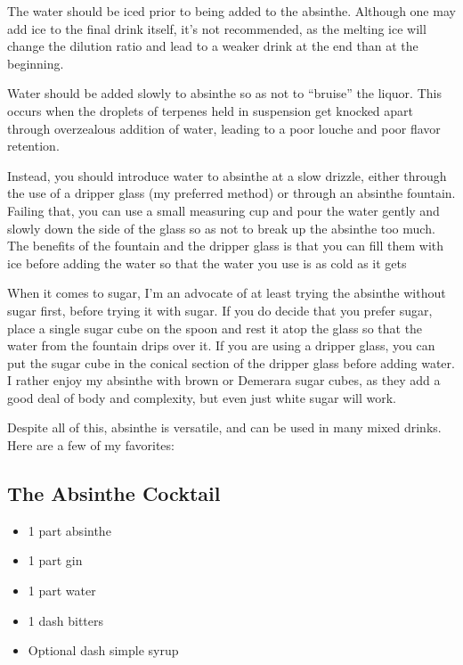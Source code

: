 \documentclass[12pt,letterpaper,oneside]{memoir}
\begin{document}
  The water should be iced prior to being added to the absinthe.  Although one may add ice to the final drink itself, it's not recommended, as the melting ice will change the dilution ratio and lead to a weaker drink at the end than at the beginning.

  Water should be added slowly to absinthe so as not to ``bruise'' the liquor.  This occurs when the droplets of terpenes held in suspension get knocked apart through overzealous addition of water, leading to a poor louche and poor flavor retention.

  Instead, you should introduce water to absinthe at a slow drizzle, either through the use of a dripper glass (my preferred method) or through an absinthe fountain.  Failing that, you can use a small measuring cup and pour the water gently and slowly down the side of the glass so as not to break up the absinthe too much.  The benefits of the fountain and the dripper glass is that you can fill them with ice before adding the water so that the water you use is as cold as it gets

  When it comes to sugar, I'm an advocate of at least trying the absinthe without sugar first, before trying it with sugar.  If you do decide that you prefer sugar, place a single sugar cube on the spoon and rest it atop the glass so that the water from the fountain drips over it.  If you are using a dripper glass, you can put the sugar cube in the conical section of the dripper glass before adding water.  I rather enjoy my absinthe with brown or Demerara sugar cubes, as they add a good deal of body and complexity, but even just white sugar will work.

  Despite all of this, absinthe is versatile, and can be used in many mixed drinks.  Here are a few of my favorites:

  \subsection*{The Absinthe Cocktail}

  \begin{itemize}[noitemsep]
    \item 1 part absinthe
    \item 1 part gin
    \item 1 part water
    \item 1 dash bitters
    \item Optional dash simple syrup
  \end{itemize}
\end{document}
